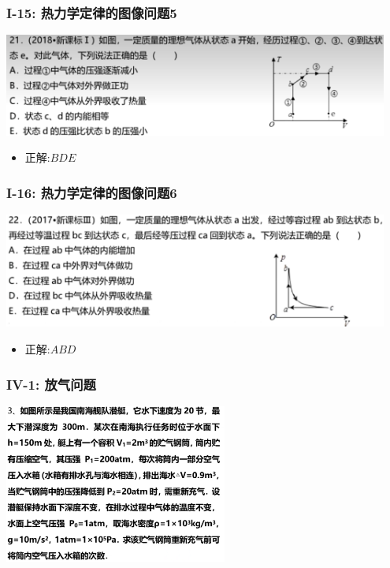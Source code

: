 \documentclass{article}
\begin{document}
\vspace{2em}

\subsubsection{I-15: 热力学定律的图像问题5}
\includegraphics[width = 0.95\textwidth,keepaspectratio]{./pictures/2.3-37.png}

\begin{itemize}
    \item 正解:\quad $BDE$
\end{itemize}

\vspace{2em}

\subsubsection{I-16: 热力学定律的图像问题6}
\includegraphics[width = 0.95\textwidth,keepaspectratio]{./pictures/2.3-38.png}

\begin{itemize}
    \item 正解:\quad $ABD$
\end{itemize}

\vspace{2em}

\subsubsection{IV-1: 放气问题}
\includegraphics[width = 0.55\textwidth,keepaspectratio]{./pictures/2.3-11.png}
\end{document}
